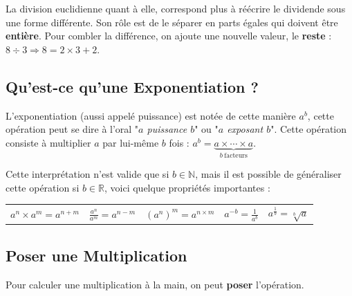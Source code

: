 \documentclass[a4paper]{article}
\begin{document}
	La division euclidienne quant à elle, correspond plus à réécrire le dividende sous une forme différente. Son rôle est de le séparer en parts égales qui doivent être \textbf{entière}. Pour combler la différence, on ajoute une nouvelle valeur, le \textbf{reste} : $ 8 \div 3 \Longrightarrow 8 = 2 \times 3 + 2$.

\vspace{5 mm}

\subsection*{Qu'est-ce qu'une Exponentiation ?}

L'exponentiation (aussi appelé puissance) est notée de cette manière $a^b$, cette opération peut se dire à l'oral "\textit{$a$ puissance $b$}" ou "\textit{$a$ exposant $b$}". Cette opération consiste à multiplier $a$ par lui-même $b$ fois : $a^b = \underbrace {a\times \cdots \times a} _{b\ \mathrm {facteurs}}$.

\vspace{2 mm}

Cette interprétation n'est valide que si $b \in \mathbb{N}$, mais il est possible de généraliser cette opération si $b \in \mathbb{R}$, voici quelque propriétés importantes :

\vspace{-1 mm}

\begin{Large}
\begin{center}
\begin{tabular}{c||c||c||c||c}

$a^n \times a^m = a^{n+m}$ & $\frac{a^n}{a^m} = a^{n-m}$ & $ (a^n)^m = a^{n\times m}$ & $ a^{-b} = \frac{1}{a^b}$ & $a^{\frac{1}{b}} = \sqrt[b]{a}$\\

\end{tabular}
\end{center}
\end{Large}

\pagebreak






\subsection{Poser une Multiplication}

Pour calculer une multiplication à la main, on peut \textbf{poser} l'opération.\\
\end{document}
